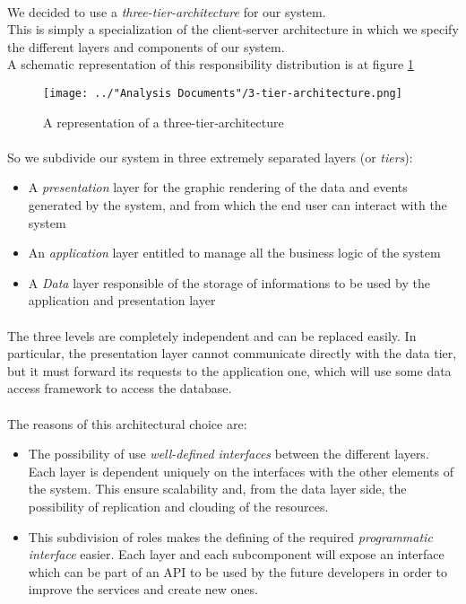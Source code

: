 \paragraph{} We decided to use a \textit{three-tier-architecture} for our system.\\
This is simply a specialization of the client-server architecture in which we specify the different layers and components of our system.\\
A schematic representation of this responsibility distribution is at figure \ref{fig:3-tier-architecture}

\begin{figure}[H]
	\centering
	\texttt{[image: ../"Analysis Documents"/3-tier-architecture.png]}
	\caption{A representation of a three-tier-architecture}
	\label{fig:3-tier-architecture}
\end{figure}
\paragraph{} So we subdivide our system in three extremely separated layers (or \textit{tiers}):
\begin{itemize}
	\item A \textit{presentation} layer for the graphic rendering of the data and events generated by the system, and from which the end user can interact with the system
	\item An \textit{application} layer entitled to manage all the business logic of the system
	\item A \textit{Data} layer responsible of the storage of informations to be used by the application and presentation layer
\end{itemize}
\paragraph{}The three levels are completely independent and can be replaced easily. In particular, the presentation layer cannot communicate directly with the data tier, but it must forward its requests to the application one, which will use some data access framework to access the database.
\paragraph{} The reasons of this architectural choice are:
\begin{itemize}
	\item The possibility of use \textit{well-defined interfaces} between the different layers. Each layer is dependent uniquely on the interfaces with the other elements of the system. This ensure scalability and, from the data layer side, the possibility of replication and clouding of the resources.
	\item This subdivision of roles makes the defining of the required \textit{programmatic interface} easier. Each layer and each subcomponent will expose an interface which can be part of an API to be used by the future developers in order to improve the services and create new ones.
\end{itemize}


